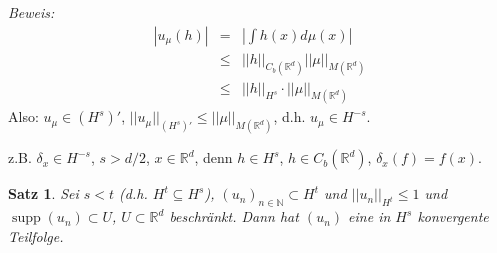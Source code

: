 \documentclass[11pt,a4paper,titlepage, ngerman]{scrartcl}
\newtheorem{Satz}{Satz}[section]
\DeclareMathOperator{\supp}{supp}
\numberwithin{equation}{section}
\newcommand{\R}{\mathbb{R}} %
\newcommand{\N}{\mathbb{N}} %
\newcommand{\m}{\cdot}
\newcommand{\Bew}{\emph{Beweis: }}
\begin{document}
	\Bew 
	\begin{eqnarray}
		|u_\mu(h)| &=& |\int h(x)d\mu(x)|\nonumber\\
		&\leq& ||h||_{C_b(\R^d)}||\mu||_{M(\R^d)}\nonumber\\
		&\leq& ||h||_{H^s}\m ||\mu||_{M(\R^d)}\nonumber
	\end{eqnarray}
	Also: $u_\mu\in (H^s)'$, $||u_\mu||_{(H^s)'}\leq ||\mu||_{M(\R^d)}$, d.h. $u_\mu\in H^{-s}$. 
	
	z.B. $\delta_x\in H^{-s}$, $s>d/2$, $x\in \R^d$, denn $h\in H^s$, $h\in C_b(\R^d)$, $\delta_x(f) = f(x)$.
	
	\begin{Satz}
		Sei $s<t$ (d.h. $H^t\subseteq H^s$), $(u_n)_{n\in\N}\subset H^t$ und $||u_n||_{H^t}\leq 1$ und $\supp(u_n)\subset U$, $U\subset \R^d$ beschränkt. Dann hat $(u_n)$ eine in $H^s$ konvergente Teilfolge.
	\end{Satz}
	
	
	
	
	
	
	
	
	
	
	
	
	
	
	
	
	
	
	
	
	
	
	
	
	
	
\end{document}
